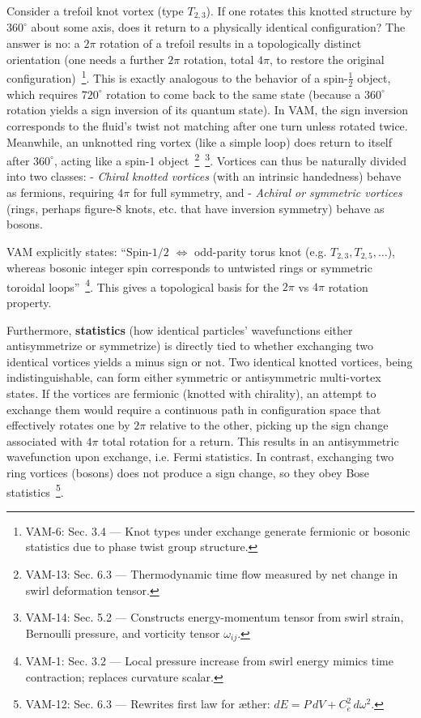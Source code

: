\documentclass[a4paper,12pt]{article}
\begin{document}
    Consider a trefoil knot vortex (type $T_{2,3}$). If one rotates this knotted structure by $360^\circ$ about some axis, does it return to a physically identical configuration? The answer is no: a $2\pi$ rotation of a trefoil results in a topologically distinct orientation (one needs a further $2\pi$ rotation, total $4\pi$, to restore the original configuration)~\footnote{VAM-6: Sec. 3.4 — Knot types under exchange generate fermionic or bosonic statistics due to phase twist group structure.}. This is exactly analogous to the behavior of a spin-$\frac{1}{2}$ object, which requires $720^\circ$ rotation to come back to the same state (because a $360^\circ$ rotation yields a sign inversion of its quantum state). In VAM, the sign inversion corresponds to the fluid's twist not matching after one turn unless rotated twice. Meanwhile, an unknotted ring vortex (like a simple loop) does return to itself after $360^\circ$, acting like a spin-1 object~\footnote{VAM-13: Sec. 6.3 — Thermodynamic time flow measured by net change in swirl deformation tensor.}~\footnote{VAM-14: Sec. 5.2 — Constructs energy-momentum tensor from swirl strain, Bernoulli pressure, and vorticity tensor $\omega_{ij}$.}. Vortices can thus be naturally divided into two classes:
    - \emph{Chiral knotted vortices} (with an intrinsic handedness) behave as fermions, requiring $4\pi$ for full symmetry, and
    - \emph{Achiral or symmetric vortices} (rings, perhaps figure-8 knots, etc. that have inversion symmetry) behave as bosons.

    VAM explicitly states: “Spin-$1/2$ $\Longleftrightarrow$ odd-parity torus knot (e.g. $T_{2,3}, T_{2,5},\dots$), whereas bosonic integer spin corresponds to untwisted rings or symmetric toroidal loops”~\footnote{VAM-1: Sec. 3.2 — Local pressure increase from swirl energy mimics time contraction; replaces curvature scalar.}. This gives a topological basis for the $2\pi$ vs $4\pi$ rotation property.

    Furthermore, \textbf{statistics} (how identical particles' wavefunctions either antisymmetrize or symmetrize) is directly tied to whether exchanging two identical vortices yields a minus sign or not. Two identical knotted vortices, being indistinguishable, can form either symmetric or antisymmetric multi-vortex states. If the vortices are fermionic (knotted with chirality), an attempt to exchange them would require a continuous path in configuration space that effectively rotates one by $2\pi$ relative to the other, picking up the sign change associated with $4\pi$ total rotation for a return. This results in an antisymmetric wavefunction upon exchange, i.e. Fermi statistics. In contrast, exchanging two ring vortices (bosons) does not produce a sign change, so they obey Bose statistics~\footnote{VAM-12: Sec. 6.3 — Rewrites first law for æther: $dE = P\,dV + C_e^2\,d\omega^2$.}.
\end{document}
